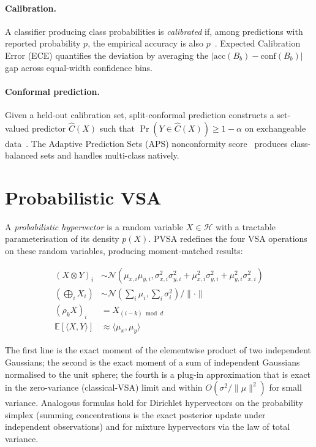 \documentclass[11pt]{article}
\begin{document}
\paragraph{Calibration.} A classifier producing class probabilities is
\emph{calibrated} if, among predictions with reported probability $p$,
the empirical accuracy is also $p$~\citep{guo2017calibration}. Expected
Calibration Error (ECE) quantifies the deviation
by averaging the $\lvert \mathrm{acc}(B_b) - \mathrm{conf}(B_b) \rvert$
gap across equal-width confidence bins.

\paragraph{Conformal prediction.} Given a held-out calibration set,
split-conformal prediction constructs a set-valued predictor
$\hat{C}(X)$ such that $\Pr(Y \in \hat{C}(X)) \geq 1 - \alpha$ on
exchangeable data~\citep{vovk2005algorithmic}. The Adaptive Prediction
Sets (APS) nonconformity score~\citep{romano2020classification} produces
class-balanced sets and handles multi-class natively.

\section{Probabilistic VSA}
\label{sec:pvsa}

A \emph{probabilistic hypervector} is a random variable $X \in \mathcal{H}$
with a tractable parameterisation of its density $p(X)$. PVSA
redefines the four VSA operations on these random variables, producing
moment-matched results:

\begin{align}
(X \otimes Y)_i &\sim \mathcal{N}(\mu_{x,i} \mu_{y,i}, \sigma_{x,i}^2 \sigma_{y,i}^2
+ \mu_{x,i}^2 \sigma_{y,i}^2 + \mu_{y,i}^2 \sigma_{x,i}^2) \tag{bind} \\
\left(\bigoplus_i X_i\right) &\sim \mathcal{N}\!\left(\sum_i \mu_i, \sum_i \sigma_i^2\right)
\big/ \lVert \cdot \rVert \tag{bundle}\\
(\rho_k X)_i &= X_{(i - k) \bmod d} \tag{permute}\\
\mathbb{E}[\langle X, Y \rangle] &\approx \langle \mu_x, \mu_y \rangle \tag{similarity}
\end{align}

The first line is the exact moment of the elementwise product of two
independent Gaussians; the second is the exact moment of a sum of
independent Gaussians normalised to the unit sphere; the fourth is a
plug-in approximation that is exact in the zero-variance (classical-VSA)
limit and within $O(\sigma^2 / \lVert \mu \rVert^2)$ for small variance.
Analogous formulas hold for Dirichlet hypervectors on the probability
simplex (summing concentrations is the exact posterior update under
independent observations) and for mixture hypervectors via the law of
total variance.
\end{document}

